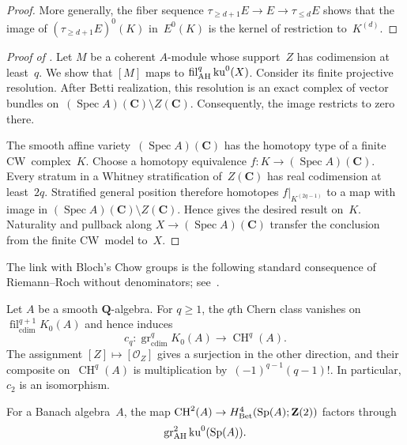 \documentclass[11pt,a4paper]{amsart}
\newcommand{\cref}[1]{\zcref{#1}}
\numberwithin{equation}{section}
\theoremstyle{plain}
\theoremstyle{definition}
\theoremstyle{remark}
\newcommand{\ZZ}{\mathbf{Z}}
\newcommand{\QQ}{\mathbf{Q}}
\newcommand{\CC}{\mathbf{C}}
\newcommand{\AH}{\textnormal{AH}}
\newcommand{\Bet}{\textnormal{Bet}}
\newcommand{\CH}{\operatorname{CH}}
\newcommand{\Spec}{\operatorname{Spec}}
\newcommand{\Sp}{\operatorname{Sp}}
\newcommand{\cdim}{\operatorname{cdim}}
\newcommand{\fil}{\operatorname{fil}}
\newcommand{\gr}{\operatorname{gr}}
\newcommand{\ku}{\operatorname{ku}}
\newcommand{\shf}[1]{\mathcal{#1}}
\begin{document}
\begin{proof}
  More generally, the fiber sequence
  \(\tau_{\geq d+1}E\to E\to\tau_{\leq d}E\)
  shows that the image of \((\tau_{\geq d+1}E)^{0}(K)\)
  in~\(E^{0}(K)\) is the kernel of restriction to~\(K^{(d)}\).
\end{proof}

\begin{proof}[Proof of \cref{fils}]
  Let \(M\) be a coherent \(A\)-module whose support~\(Z\)
  has codimension at least~\(q\).
  We show that \([M]\) maps to \(\fil^{q}_{\AH}\ku^{0}(X)\).
  Consider its finite projective resolution.
  After Betti realization,
  this resolution is an exact complex of vector
  bundles on~\((\Spec A)(\CC)\setminus Z(\CC)\).
  Consequently,
  the image restricts to zero there.

  The smooth affine variety~\((\Spec A)(\CC)\)
  has the homotopy type of a finite CW~complex~\(K\).
  Choose a homotopy equivalence \(f\colon K\to(\Spec A)(\CC)\).
  Every stratum
  in a Whitney stratification of~\(Z(\CC)\)
  has real codimension at least~\(2q\).
  Stratified general position therefore homotopes
  \(f\rvert_{K^{(2q-1)}}\)
  to a map with image in \((\Spec A)(\CC)\setminus Z(\CC)\).
  Hence \cref{xdm1cd} gives the desired result on~\(K\).
  Naturality and pullback along \(X\to(\Spec A)(\CC)\) transfer the conclusion from
  the finite CW~model to~\(X\).
\end{proof}

The link with Bloch’s Chow groups
is the following standard consequence
of Riemann–Roch without denominators;
see~\cite[Example~15.3.5]{Fulton98}.

\begin{proposition}\label{x4oj1b}
  Let \(A\) be a smooth \(\QQ\)-algebra.
  For \(q\geq1\), the \(q\)th Chern class vanishes on
  \(\fil^{q+1}_{\cdim}K_{0}(A)\) and hence induces
  \begin{equation*}
    c_{q}\colon
    \gr^{q}_{\cdim}K_{0}(A)\to\CH^{q}(A).
  \end{equation*}
  The assignment \([Z]\mapsto[\shf O_{Z}]\) gives a surjection in the
  other direction, and their composite on~\(\CH^{q}(A)\) is
  multiplication by~\((-1)^{q-1}(q-1)!\).
  In particular, \(c_{2}\) is an isomorphism.
\end{proposition}

\begin{corollary}\label{xxjrs2}
  For a Banach algebra~\(A\),
  the map
  \(\CH^{2}(A)\to H^{4}_{\Bet}(\Sp(A);\ZZ(2))\)
  factors through
  \begin{equation*}
    \gr^{2}_{\AH}\ku^{0}(\Sp(A)).
  \end{equation*}
\end{corollary}
\end{document}
